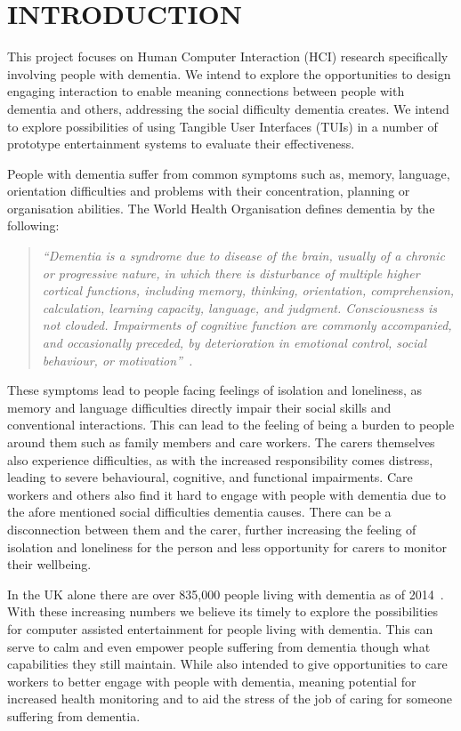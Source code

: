 \chapter{INTRODUCTION}
\setcounter{page}{1}

This project focuses on Human Computer Interaction (HCI) research specifically involving people with dementia.  We intend to explore the opportunities to design engaging interaction to enable meaning connections between people with dementia and others, addressing the social difficulty dementia creates.
We intend to explore possibilities of using Tangible User Interfaces (TUIs) in a number of prototype entertainment systems to evaluate their effectiveness.

People with dementia suffer from common symptoms such as, memory, language, orientation difficulties and problems with their concentration, planning or organisation abilities. The World Health Organisation defines dementia by the following:

\begin{quote}
\emph{``Dementia is a syndrome due to disease of the brain, usually of a chronic or progressive nature, in which there is disturbance of multiple higher cortical functions, including memory, thinking, orientation, comprehension, calculation, learning capacity, language, and judgment. Consciousness is not clouded. Impairments of cognitive function are commonly accompanied, and occasionally preceded, by deterioration in emotional control, social behaviour, or motivation''~\cite{organizationicd10}.}
\end{quote}

These symptoms lead to people facing feelings of isolation and loneliness, as memory and language difficulties directly impair their social skills and conventional interactions.
This can lead to the feeling of being a burden to people around them such as family members and care workers.
The carers themselves also experience difficulties, as with the increased responsibility comes distress, leading to severe behavioural, cognitive, and functional impairments.
Care workers and others also find it hard to engage with people with dementia due to the afore mentioned social difficulties dementia causes. 
There can be a disconnection between them and the carer, further increasing the feeling of isolation and loneliness for the person and less opportunity for carers to monitor their wellbeing. 

In the UK alone there are over 835,000 people living with dementia as of 2014~\cite{dem-stats}. With these increasing numbers we believe its timely to explore the possibilities for computer assisted entertainment for people living with dementia.
This can serve to calm and even empower people suffering from dementia though what capabilities they still maintain. 
While also intended to give opportunities to care workers to better engage with people with dementia, meaning potential for increased health monitoring and to aid the stress of the job of caring for someone suffering from dementia.

